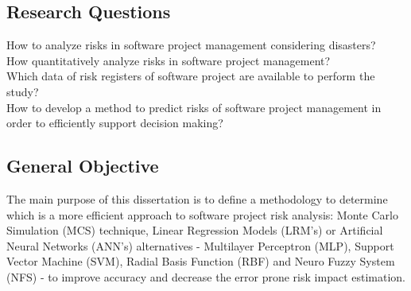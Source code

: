 \subsection{Research Questions}

How to analyze risks in software project management considering disasters? \\
How quantitatively analyze risks in software project management? \\
Which data of risk registers of software project are available to perform the study? \\
How to develop a method to predict risks of software project management in order to efficiently support decision making? \\

\subsection{General Objective}

The main purpose of this dissertation is to define a methodology to determine which is a more efficient approach to software project risk analysis: Monte Carlo Simulation (MCS) technique, Linear Regression Models (LRM's) or Artificial Neural Networks (ANN's) alternatives - Multilayer Perceptron (MLP), Support Vector Machine (SVM), Radial Basis Function (RBF) and Neuro Fuzzy System (NFS) - to improve accuracy and decrease the error prone risk impact estimation.

